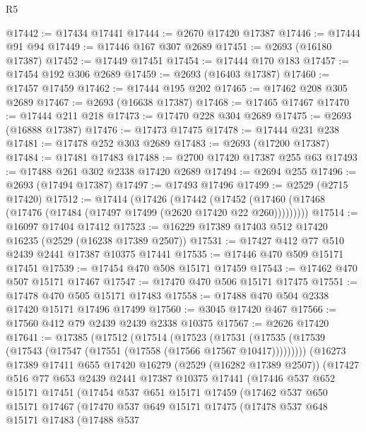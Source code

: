 \begin{lexlean}{R5}
\begin{coremodule}
@17442 := @17434 @17441
@17444 := @2670 @17420 @17387
@17446 := @17444 @91 @94
@17449 := @17446 @167 @307 @2689
@17451 := @2693 (@16180 @17387)
@17452 := @17449 @17451
@17454 := @17444 @170 @183
@17457 := @17454 @192 @306 @2689
@17459 := @2693 (@16403 @17387)
@17460 := @17457 @17459
@17462 := @17444 @195 @202
@17465 := @17462 @208 @305 @2689
@17467 := @2693 (@16638 @17387)
@17468 := @17465 @17467
@17470 := @17444 @211 @218
@17473 := @17470 @228 @304 @2689
@17475 := @2693 (@16888 @17387)
@17476 := @17473 @17475
@17478 := @17444 @231 @238
@17481 := @17478 @252 @303 @2689
@17483 := @2693 (@17200 @17387)
@17484 := @17481 @17483
@17488 := @2700 @17420 @17387 @255 @63
@17493 := @17488 @261 @302 @2338 @17420 @2689
@17494 := @2694 @255
@17496 := @2693 (@17494 @17387)
@17497 := @17493 @17496
@17499 := @2529 (@2715 @17420)
@17512 := @17414
    (@17426
      (@17442 (@17452 (@17460 (@17468 (@17476 (@17484 (@17497 @17499 (@2620 @17420 @22 @260)))))))))
@17514 := @16097 @17404 @17412
@17523 := @16229 @17389 @17403 @512 @17420 @16235 (@2529 (@16238 @17389 @2507))
@17531 := @17427 @412 @77 @510 @2439 @2441 @17387 @10375 @17441
@17535 := @17446 @470 @509 @15171 @17451
@17539 := @17454 @470 @508 @15171 @17459
@17543 := @17462 @470 @507 @15171 @17467
@17547 := @17470 @470 @506 @15171 @17475
@17551 := @17478 @470 @505 @15171 @17483
@17558 := @17488 @470 @504 @2338 @17420 @15171 @17496 @17499
@17560 := @3045 @17420 @467
@17566 := @17560 @412 @79 @2439 @2439 @2338 @10375
@17567 := @2626 @17420
@17641 := @17385
    (@17512
      (@17514
        (@17523
          (@17531 (@17535 (@17539 (@17543 (@17547 (@17551 (@17558 (@17566 @17567 @10417)))))))))
        (@16273
          @17389
          @17411
          @655
          @17420
          @16279
          (@2529 (@16282 @17389 @2507))
          (@17427
            @516
            @77
            @653
            @2439
            @2441
            @17387
            @10375
            @17441
            (@17446
              @537
              @652
              @15171
              @17451
              (@17454
                @537
                @651
                @15171
                @17459
                (@17462
                  @537
                  @650
                  @15171
                  @17467
                  (@17470
                    @537
                    @649
                    @15171
                    @17475
                    (@17478
                      @537
                      @648
                      @15171
                      @17483
                      (@17488
                        @537

\end{coremodule}
\end{lexlean}
